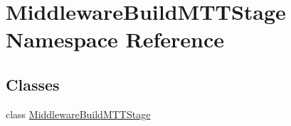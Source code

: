 \hypertarget{namespaceMiddlewareBuildMTTStage}{\section{Middleware\-Build\-M\-T\-T\-Stage Namespace Reference}
\label{namespaceMiddlewareBuildMTTStage}
}
\subsection*{Classes}
\begin{DoxyCompactItemize}
\item 
class \hyperlink{classMiddlewareBuildMTTStage_1_1MiddlewareBuildMTTStage}{Middleware\-Build\-M\-T\-T\-Stage}
\end{DoxyCompactItemize}
